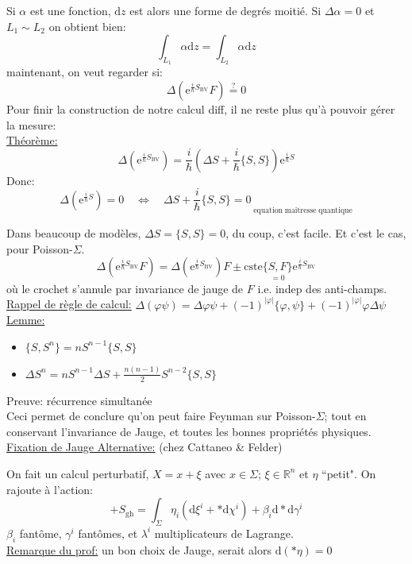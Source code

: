 \documentclass[a4paper,11pt]{article}
\renewcommand{\d}{{\mathrm{d}}}
\newcommand{\e}{{\mathrm{e}}}
\begin{document}
Si $\alpha$ est une fonction, $\d z$ est alors une forme de degrés moitié. Si $\Delta \alpha = 0$ et $L_1\sim L_2$ on obtient bien:
$$\int_{L_1} \alpha \d z = \int_{L_2} \alpha \d z$$ maintenant, on veut regarder si:
$$\Delta(\e^{\frac i\hbar S_\mathrm{BV}}F) \overset?= 0$$
Pour finir la construction de notre calcul diff, il ne reste plus qu'à pouvoir gérer la mesure:\\

\noindent\underline{Théorème:}
$$\Delta(\e^{\frac i\hbar S_\mathrm{BV}}) = \frac{i}{\hbar} \left(\Delta S + \frac{i}{\hbar} \{S,S\}\right) \e^{\frac i\hbar S}$$
Donc:
$$\Delta(\e^{\frac i\hbar S})=0 \quad \iff \quad \boxed{\Delta S + \frac{i}{\hbar} \{S,S\} = 0}_{\;\mathrm{equation}\;\mathrm{maitresse}\;\mathrm{quantique}}$$

Dans beaucoup de modèles, $\Delta S = \{S,S\} = 0$, du coup, c'est facile. Et c'est le cas, pour Poisson-$\Sigma$.
$$\Delta(\e^{\frac i\hbar S_\mathrm{BV}}F) = \Delta(\e^{\frac i\hbar S_\mathrm{BV}})F \pm \mathrm{cste}\underset{=0}{\{S,F\}} \e^{\frac i\hbar S_\mathrm{BV}}$$
où le crochet s'annule par invariance de jauge de $F$ i.e. indep des anti-champs.\\
\underline{Rappel de règle de calcul:} $\Delta(\varphi\psi) = \Delta\varphi \psi + (-1)^{|\varphi|}\{\varphi,\psi\} + (-1)^{|\varphi|} \varphi\Delta\psi$\\

\noindent\underline{Lemme:}
\begin{itemize}
\item $\{S,S^n\} = n S^{n-1} \{S,S\}$
\item $\Delta S^n = n S^{n-1} \Delta S + \frac{n(n-1)}2 S^{n-2}\{S,S\}$
\end{itemize}
Preuve: récurrence simultanée\\

Ceci permet de conclure qu'on peut faire Feynman sur Poisson-$\Sigma$; tout en conservant l'invariance de Jauge, et toutes les bonnes propriétés physiques.\\

\noindent\underline{Fixation de Jauge Alternative:} (chez Cattaneo \& Felder)

On fait un calcul perturbatif, $X=x+\xi$ avec $x\in\Sigma$; $\xi \in \mathbb{R}^n$ et $\eta$ ``petit". On rajoute à l'action:
$$+ S_\mathrm{gh} = \int_\Sigma \eta_i (\d\xi^i + * \d \chi^i) + \beta_i \d * \d \gamma^i$$
$\beta_i$ fantôme, $\gamma^i$ fantômes, et $\lambda^i$ multiplicateurs de Lagrange.\\
\underline{Remarque du prof:} un bon choix de Jauge, serait alors $\d(*\eta)=0$
\end{document}
